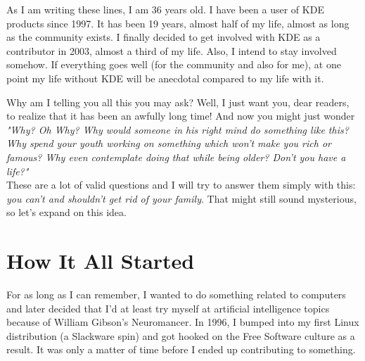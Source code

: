

\noindent{}As I am writing these lines, I am 36 years old. I have been a user of KDE
products since 1997. It has been 19 years, almost half of my life, almost
as long as the community exists. I finally decided to get involved with KDE
as a contributor in 2003, almost a third of my life. Also, I intend to stay
involved somehow. If everything goes well (for the community and also for me),
at one point my life without KDE will be anecdotal compared to my life with
it.

Why am I telling you all this you may ask? Well, I just want you, dear readers,
to realize that it has been an awfully long time! And now you might just wonder
\emph{"Why? Oh Why? Why would someone in his right mind do something like this?
Why spend your youth working on something which won't make you rich or famous?
Why even contemplate doing that while being older? Don't you have a life?"} \\

These are a lot of valid questions and I will try to answer them simply with this:
\emph{you can't and shouldn't get rid of your family}. That might still sound
mysterious, so let's expand on this idea.

\section*{How It All Started}
For as long as I can remember, I wanted to do something related to computers and
later decided that I'd at least try myself at artificial intelligence topics because of William Gibson's
Neuromancer. In 1996, I bumped into my first Linux distribution (a Slackware
spin) and got hooked on the Free Software culture as a result. It was only a
matter of time before I ended up contributing to something. \\

